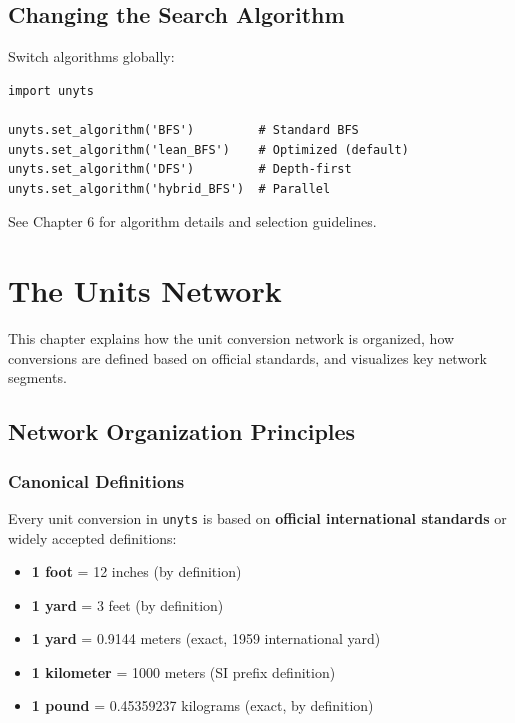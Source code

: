 \documentclass[11pt,a4paper]{report}
\begin{document}
\section{Changing the Search Algorithm}

Switch algorithms globally:

\begin{lstlisting}[style=pythonstyle]
import unyts

unyts.set_algorithm('BFS')         # Standard BFS
unyts.set_algorithm('lean_BFS')    # Optimized (default)
unyts.set_algorithm('DFS')         # Depth-first
unyts.set_algorithm('hybrid_BFS')  # Parallel
\end{lstlisting}

See Chapter 6 for algorithm details and selection guidelines.


\chapter{The Units Network}

This chapter explains how the unit conversion network is organized, how conversions are defined based on official standards, and visualizes key network segments.

\section{Network Organization Principles}

\subsection{Canonical Definitions}

Every unit conversion in \texttt{unyts} is based on \textbf{official international standards} or widely accepted definitions:

\begin{itemize}[leftmargin=*]
  \item \textbf{1 foot} = 12 inches (by definition)
  \item \textbf{1 yard} = 3 feet (by definition)
  \item \textbf{1 yard} = 0.9144 meters (exact, 1959 international yard)
  \item \textbf{1 kilometer} = 1000 meters (SI prefix definition)
  \item \textbf{1 pound} = 0.45359237 kilograms (exact, by definition)
\end{itemize}
\end{document}
